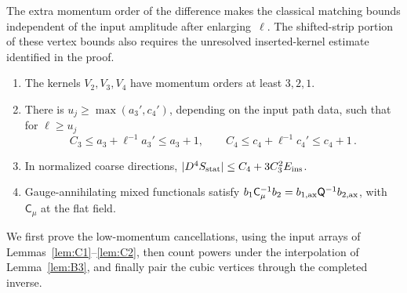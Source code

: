 The extra momentum order of the difference makes the classical matching bounds independent of the input amplitude after enlarging~$\ell$. The shifted-strip portion of these vertex bounds also requires the unresolved inserted-kernel estimate identified in the proof.
\begin{lemma}\label{lem:B5}
\begin{enumerate}[label=(\roman*)]
\item The kernels $V_2,V_3,V_4$ have momentum orders at least $3,2,1$.
\item There is $u_j\ge\max(a_3',c_4')$, depending on the input path data, such that for $\ell\ge u_j$
\begin{equation*}
C_3\le a_3+\ell^{-1}a_3'\le a_3+1,\qquad C_4\le c_4+\ell^{-1}c_4'\le c_4+1\,.
\end{equation*}
\item In normalized coarse directions, $|D^4S_{\rm stat}|\le C_4+3C_3^2E_{\rm ins}$.
\item Gauge-annihilating mixed functionals satisfy $b_1\mathsf C_\mu^{-1}b_2=b_{1,\rm ax}\mathsf Q^{-1}b_{2,\rm ax}$, with $\mathsf C_\mu$ at the flat field.
\end{enumerate}
\end{lemma}
We first prove the low-momentum cancellations, using the input arrays of Lemmas~\ref{lem:C1}--\ref{lem:C2}, then count powers under the interpolation of Lemma~\ref{lem:B3}, and finally pair the cubic vertices through the completed inverse.
